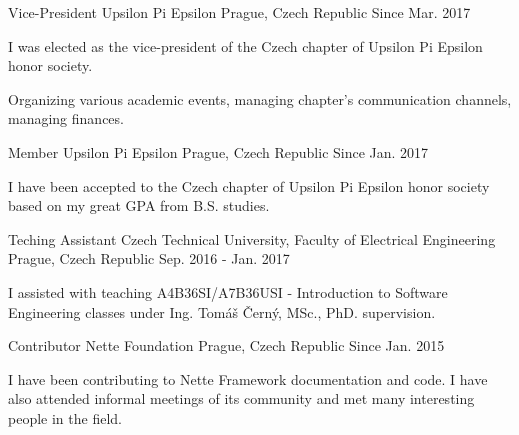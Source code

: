 \begin{cventries}
  \cventry
    {Vice-President}
    {Upsilon Pi Epsilon}
    {Prague, Czech Republic}
    {Since Mar. 2017}
    {
      \begin{cvitems}
        \item {I was elected as the vice-president of the Czech chapter of Upsilon Pi Epsilon honor society.}
        \item {Organizing various academic events, managing chapter's communication channels, managing finances.}
      \end{cvitems}
    }
  \cventry
    {Member}
    {Upsilon Pi Epsilon}
    {Prague, Czech Republic}
    {Since Jan. 2017}
    {
      \begin{cvitems}
        \item {I have been accepted to the Czech chapter of Upsilon Pi Epsilon honor society based on my great GPA from B.S. studies.}
      \end{cvitems}
    }
  \cventry
    {Teching Assistant}
    {Czech Technical University, Faculty of Electrical Engineering}
    {Prague, Czech Republic}
    {Sep. 2016 - Jan. 2017}
    {
      \begin{cvitems}
        \item {I assisted with teaching A4B36SI/A7B36USI - Introduction to Software Engineering classes under Ing. Tomáš Černý, MSc., PhD. supervision.}
      \end{cvitems}
    }
  \cventry
    {Contributor}
    {Nette Foundation}
    {Prague, Czech Republic}
    {Since Jan. 2015}
    {
      \begin{cvitems}
        \item {I have been contributing to Nette Framework documentation and code. I have also attended informal meetings of its community and met many interesting people in the field.}
      \end{cvitems}
    }
\end{cventries}
